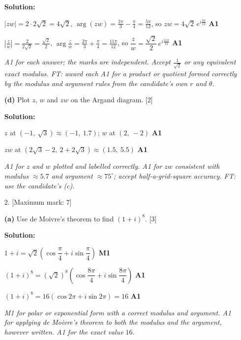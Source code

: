 \documentclass[12pt, twoside]{article}
\begin{document}
\begin{enumerate}[itemsep=0.3cm]
\textbf{Solution:}

$|zw| = 2 \cdot 2\sqrt{2} = 4\sqrt{2}$,
$\arg(zw) = \frac{2\pi}{3} - \frac{\pi}{4} = \frac{5\pi}{12}$, so
$zw = 4\sqrt{2}\,e^{i\frac{5\pi}{12}}$ \hfill \textbf{A1}

$\left|\frac{z}{w}\right| = \frac{2}{2\sqrt{2}} = \frac{\sqrt{2}}{2}$,
$\arg\frac{z}{w} = \frac{2\pi}{3} + \frac{\pi}{4} = \frac{11\pi}{12}$, so
$\dfrac{z}{w} = \dfrac{\sqrt{2}}{2}\,e^{i\frac{11\pi}{12}}$
\hfill \textbf{A1}

\emph{A1 for each answer; the marks are independent. Accept
$\frac{1}{\sqrt{2}}$ or any equivalent exact modulus. FT: award each A1 for
a product or quotient formed correctly by the modulus and argument rules
from the candidate's own $r$ and $\theta$.}

\medskip

\textbf{(d)} Plot $z$, $w$ and $zw$ on the Argand diagram. \hfill [2]

\textbf{Solution:}

$z$ at $(-1,\ \sqrt{3}) \approx (-1,\ 1.7)$; $w$ at $(2,\ -2)$
\hfill \textbf{A1}

$zw$ at $(2\sqrt{3} - 2,\ 2 + 2\sqrt{3}) \approx (1.5,\ 5.5)$
\hfill \textbf{A1}

\emph{A1 for $z$ and $w$ plotted and labelled correctly. A1 for $zw$
consistent with modulus $\approx 5.7$ and argument $\approx 75^\circ$;
accept half-a-grid-square accuracy. FT: use the candidate's (c).}

\newpage

\item[2.] [Maximum mark: 7]

\textbf{(a)} Use de Moivre's theorem to find $(1 + i)^8$. \hfill [3]

\textbf{Solution:}

$1 + i = \sqrt{2}\left(\cos\dfrac{\pi}{4} + i\sin\dfrac{\pi}{4}\right)$
\hfill \textbf{M1}

$(1 + i)^8 = \left(\sqrt{2}\right)^8
\left(\cos\dfrac{8\pi}{4} + i\sin\dfrac{8\pi}{4}\right)$ \hfill \textbf{A1}

$(1 + i)^8 = 16(\cos 2\pi + i\sin 2\pi) = 16$ \hfill \textbf{A1}

\emph{M1 for polar or exponential form with a correct modulus and
argument. A1 for applying de Moivre's theorem to both the modulus and the
argument, however written. A1 for the exact value $16$.}


\end{enumerate}
\end{document}
